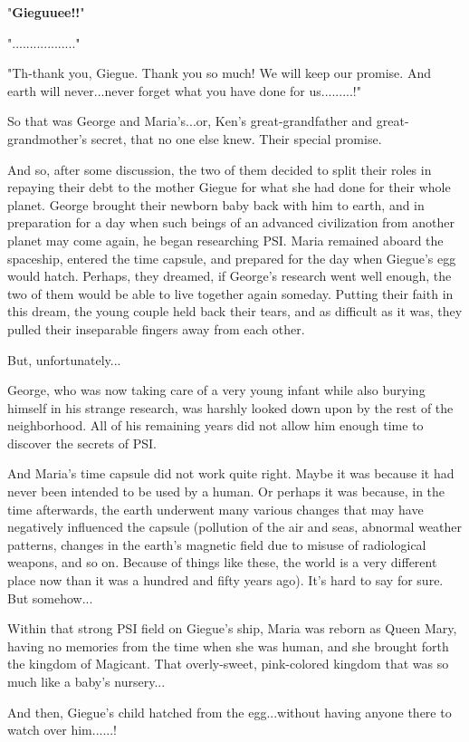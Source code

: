 \documentclass[
]{article}
\begin{document}
"\textbf{Gieguuee!!}"

".................."

"Th-thank you, Giegue. Thank you so much! We will keep our promise. And
earth will never...never forget what you have done for us.........!"

So that was George and Maria's...or, Ken's great-grandfather and
great-grandmother's secret, that no one else knew. Their special
promise.

And so, after some discussion, the two of them decided to split their
roles in repaying their debt to the mother Giegue for what she had done
for their whole planet. George brought their newborn baby back with him
to earth, and in preparation for a day when such beings of an advanced
civilization from another planet may come again, he began researching
PSI. Maria remained aboard the spaceship, entered the time capsule, and
prepared for the day when Giegue's egg would hatch. Perhaps, they
dreamed, if George's research went well enough, the two of them would be
able to live together again someday. Putting their faith in this dream,
the young couple held back their tears, and as difficult as it was, they
pulled their inseparable fingers away from each other.

But, unfortunately...

George, who was now taking care of a very young infant while also
burying himself in his strange research, was harshly looked down upon by
the rest of the neighborhood. All of his remaining years did not allow
him enough time to discover the secrets of PSI.

And Maria's time capsule did not work quite right. Maybe it was because
it had never been intended to be used by a human. Or perhaps it was
because, in the time afterwards, the earth underwent many various
changes that may have negatively influenced the capsule (pollution of
the air and seas, abnormal weather patterns, changes in the earth's
magnetic field due to misuse of radiological weapons, and so on. Because
of things like these, the world is a very different place now than it
was a hundred and fifty years ago). It's hard to say for sure. But
somehow...

Within that strong PSI field on Giegue's ship, Maria was reborn as Queen
Mary, having no memories from the time when she was human, and she
brought forth the kingdom of Magicant. That overly-sweet, pink-colored
kingdom that was so much like a baby's nursery...

And then, Giegue's child hatched from the egg...without having anyone
there to watch over him......!
\end{document}
